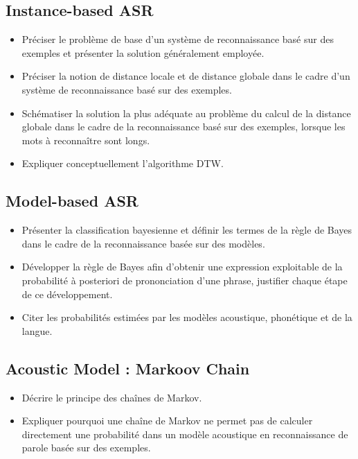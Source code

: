 \documentclass[letterpaper, 12pt]{article}
\begin{document}
	\subsection{Instance-based ASR}
		\begin{itemize}
			\setlength{\itemsep}{0pt}		
			\setlength{\parskip}{0pt}		
			\setlength{\parsep}{0pt}	
			\item Préciser le problème de base d'un système de reconnaissance basé sur des exemples et 
				présenter la solution généralement employée.		
		    \item Préciser la notion de distance locale et de distance globale dans le cadre d'un système 
		    	de reconnaissance basé sur des exemples.
         	\item Schématiser la solution la plus adéquate au problème du calcul de la distance globale 
    	    	dans le cadre de la reconnaissance basé sur des exemples, lorsque les mots à 
    	        reconnaître sont longs.
			\item Expliquer conceptuellement l'algorithme DTW.
		\end{itemize}
	\subsection{Model-based ASR}
		\begin{itemize}
			\setlength{\itemsep}{0pt}		
			\setlength{\parskip}{0pt}		
			\setlength{\parsep}{0pt}	
			\item Présenter la classification bayesienne et définir les termes de la règle de Bayes dans le cadre 
				de la reconnaissance basée sur des modèles.
    		\item Développer la règle de Bayes afin d'obtenir une expression exploitable de la probabilité 
    			à posteriori de prononciation d'une phrase, justifier chaque étape de ce développement.
    		\item Citer les probabilités estimées par les modèles acoustique, phonétique et de la langue.
		\end{itemize}
	\subsection{Acoustic Model : Markoov Chain}
		\begin{itemize}
			\setlength{\itemsep}{0pt}		
			\setlength{\parskip}{0pt}		
			\setlength{\parsep}{0pt}	
			\item Décrire le principe des chaînes de Markov.
    		\item  Expliquer pourquoi une chaîne de Markov ne permet pas de calculer directement une probabilité 
    			dans un modèle acoustique en reconnaissance de parole basée sur des exemples.
		\end{itemize}
\end{document}
